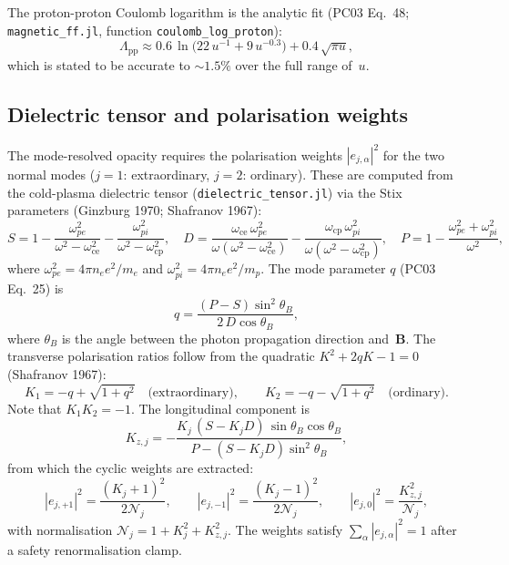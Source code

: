 \noindent
The proton-proton Coulomb logarithm is the analytic fit
(PC03 Eq.~48; \texttt{magnetic\_ff.jl}, function
\texttt{coulomb\_log\_proton}):
%
\begin{equation}
\label{eq:lambda_pp}
\Lambda_{\mathrm{pp}}
  \approx 0.6\,\ln\!\bigl(22\,u^{-1} + 9\,u^{-0.3}\bigr)
  + 0.4\,\sqrt{\pi u},
\end{equation}
%
which is stated to be accurate to ${\sim}1.5\%$ over the full range of~$u$.


\subsection{Dielectric tensor and polarisation weights}
\label{sec:opacity:dielectric}

\noindent
The mode-resolved opacity requires the polarisation weights
$|e_{j,\alpha}|^2$ for the two normal modes ($j=1$: extraordinary,
$j=2$: ordinary).  These are computed from the cold-plasma dielectric
tensor (\texttt{dielectric\_tensor.jl}) via the Stix parameters
(Ginzburg 1970; Shafranov 1967):
%
\begin{equation}
\label{eq:stix}
S = 1 - \frac{\omega_{pe}^2}{\omega^2-\omega_{\mathrm{ce}}^2}
      - \frac{\omega_{pi}^2}{\omega^2-\omega_{\mathrm{cp}}^2},\quad
D = \frac{\omega_{\mathrm{ce}}\,\omega_{pe}^2}
         {\omega(\omega^2-\omega_{\mathrm{ce}}^2)}
  - \frac{\omega_{\mathrm{cp}}\,\omega_{pi}^2}
         {\omega(\omega^2-\omega_{\mathrm{cp}}^2)},\quad
P = 1 - \frac{\omega_{pe}^2 + \omega_{pi}^2}{\omega^2},
\end{equation}
%
where $\omega_{pe}^2 = 4\pi n_e e^2/m_e$ and
$\omega_{pi}^2 = 4\pi n_e e^2/m_p$.
The mode parameter $q$ (PC03 Eq.~25) is
%
\begin{equation}
\label{eq:q_param}
q = \frac{(P-S)\sin^2\theta_B}{2\,D\cos\theta_B},
\end{equation}
%
where $\theta_B$ is the angle between the photon propagation direction
and~$\boldsymbol{B}$.  The transverse polarisation ratios follow from the
quadratic $K^2 + 2qK - 1 = 0$ (Shafranov 1967):
%
\begin{equation}
\label{eq:K_modes}
K_1 = -q + \sqrt{1+q^2}\quad\text{(extraordinary)},\qquad
K_2 = -q - \sqrt{1+q^2}\quad\text{(ordinary)}.
\end{equation}
%
Note that $K_1 K_2 = -1$.  The longitudinal component is
%
\begin{equation}
\label{eq:K_z}
K_{z,j} = -\frac{K_j\,(S - K_j D)\,\sin\theta_B\cos\theta_B}
               {P - (S - K_j D)\sin^2\theta_B},
\end{equation}
%
from which the cyclic weights are extracted:
%
\begin{equation}
\label{eq:weights}
|e_{j,+1}|^2 = \frac{(K_j+1)^2}{2\mathcal{N}_j},\qquad
|e_{j,-1}|^2 = \frac{(K_j-1)^2}{2\mathcal{N}_j},\qquad
|e_{j,0}|^2  = \frac{K_{z,j}^2}{\mathcal{N}_j},
\end{equation}
%
with normalisation $\mathcal{N}_j = 1 + K_j^2 + K_{z,j}^2$.
The weights satisfy $\sum_\alpha |e_{j,\alpha}|^2 = 1$ after a safety
renormalisation clamp.

